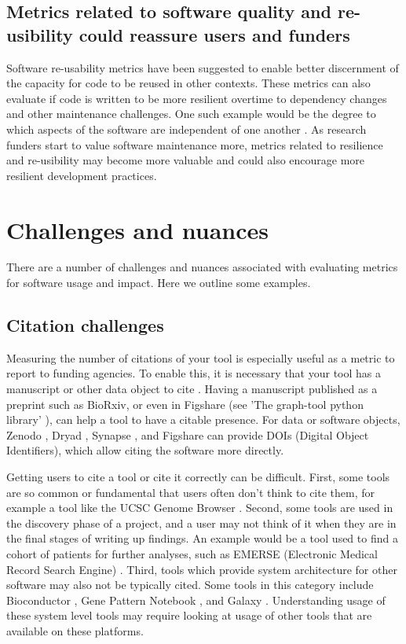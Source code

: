 \documentclass{article}
\begin{document}
\subsection{Metrics related to software quality and re-usibility could reassure users and funders}

 Software re-usability metrics have been suggested to enable better discernment of the capacity for code to be reused in other contexts. These metrics can also evaluate if code is written to be more resilient overtime to dependency changes and other maintenance challenges. One such example would be the degree to which aspects of the software are independent of one another \cite{mehboob_reusability_2021}. As research funders start to value software maintenance more, metrics related to resilience and re-usibility may become more valuable and could also encourage more resilient development practices. 


\section{Challenges and nuances}

There are a number of challenges and nuances associated with evaluating metrics for software usage and impact. Here we outline some examples.

\subsection{Citation challenges}
Measuring the number of citations of your tool is especially useful as a metric to report to funding agencies. To enable this, it is necessary that your tool has a manuscript or other data object to cite \cite{chue_hong_software_2019}. Having a manuscript published as a preprint such as BioRxiv, or even in Figshare (see 'The graph-tool python library' \cite{peixoto_graph-tool_2017}), can help a tool to have a citable presence. For data or software objects, Zenodo \cite{zenodo}, Dryad \cite{datadryad}, Synapse \cite{synapse}, and Figshare \cite{figshare} can provide DOIs (Digital Object Identifiers), which allow citing the software more directly. 

Getting users to cite a tool or cite it correctly can be difficult. First, some tools are so common or fundamental that users often don't think to cite them, for example a tool like the UCSC Genome Browser \cite{ucsc, kent_human_2002}. Second, some tools are used in the discovery phase of a project, and a user may not think of it when they are in the final stages of writing up findings. An example would be a tool used to find a cohort of patients for further analyses, such as EMERSE (Electronic Medical Record Search Engine) \cite{hanauer_supporting_2015}. Third, tools which provide system architecture for other software may also not be typically cited. Some tools in this category include Bioconductor \cite{bioconductor}, Gene Pattern Notebook \cite{reich_genepattern_2017}, and Galaxy \cite{the_galaxy_community_galaxy_2022}. Understanding usage of these system level tools may require looking at usage of other tools that are available on these platforms.   
\end{document}

